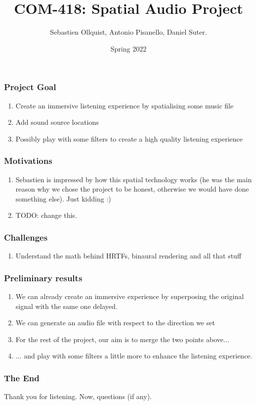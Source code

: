 \documentclass{beamer}
\title{COM-418: Spatial Audio Project}
\author{Sebastien Ollquist, Antonio Pisanello, Daniel Suter.}
\institute{EPFL}
\date{Spring 2022}
\begin{document}
\frame{\titlepage}

\begin{frame}
    \frametitle{Project Goal}
    \begin{enumerate}
        \item Create an immersive listening experience by spatialising some music file
        \item Add sound source locations
        \item Possibly play with some filters to create a high quality listening experience
    \end{enumerate}
\end{frame}

\begin{frame}
    \frametitle{Motivations}
    \begin{enumerate}
        \item Sebastien is impressed by how this spatial technology works (he was the main reason why we chose the project to be honest, otherwise we would have done something else). Just kidding :)
        \item TODO: change this.
    \end{enumerate}
\end{frame}

\begin{frame}
    \frametitle{Challenges}
    \begin{enumerate}
        \item Understand the math behind HRTFs, binaural rendering and all that stuff
    \end{enumerate}
\end{frame}

\begin{frame}
    \frametitle{Preliminary results}
    \begin{enumerate}
        \item We can already create an immersive experience by superposing the original signal with the same one delayed.
        \item We can generate an audio file with respect to the direction we set
        \item For the rest of the project, our aim is to merge the two points above...
        \item ... and play with some filters a little more to enhance the listening experience.
    \end{enumerate}
\end{frame}

\begin{frame}
    \frametitle{The End}
    Thank you for listening. Now, questions (if any).
\end{frame}
\end{document}
